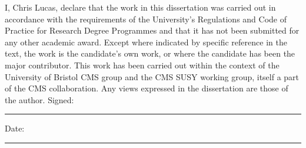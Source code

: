 


\begin{declaration}

I, Chris Lucas, declare that the work in this dissertation was carried out in
accordance with the requirements of the University's Regulations and Code of Practice
for Research Degree Programmes and that it has not been submitted for any other academic
award. Except where indicated by specific reference in the text, the work is the
candidate's own work,
or where the candidate has been the major contributor. This work has been
carried out within the context of the University of Bristol CMS group and the
CMS SUSY working group, itself a part of the CMS collaboration.
Any views expressed in the dissertation are those of the author.
\newline
\newline
\newline
Signed:\\
\rule[1em]{25em}{0.5pt}  %
\newline
Date:\\
\rule[1em]{25em}{0.5pt}  %

\end{declaration}

